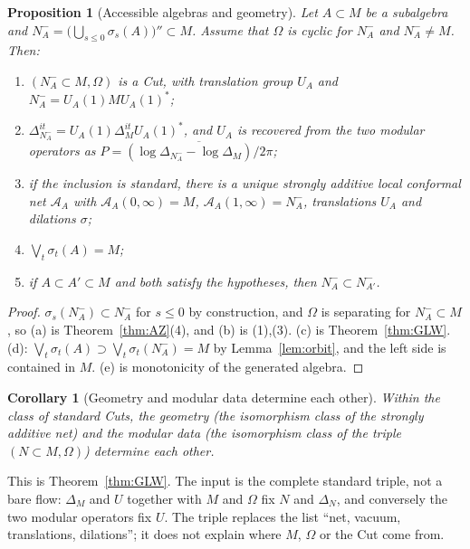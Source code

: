 \documentclass[12pt]{article}
\newtheorem{proposition}[theorem]{Proposition}
\newtheorem{corollary}[theorem]{Corollary}
\theoremstyle{definition}
\theoremstyle{remark}
\begin{document}
\begin{proposition}[Accessible algebras and geometry]\label{prop:dictionary}
Let \(A\subset M\) be a subalgebra and
\(N_A^-=\big(\bigcup_{s\le0}\sigma_s(A)\big)''\subset M\). Assume that \(\Omega\) is
cyclic for \(N_A^-\) and \(N_A^-\ne M\). Then:
\begin{enumerate}[label=(\alph*),leftmargin=2em,itemsep=1pt]
\item \((N_A^-\subset M,\Omega)\) is a Cut, with translation group \(U_A\) and
\(N_A^-=U_A(1)MU_A(1)^*\);
\item \(\Delta_{N_A^-}^{it}=U_A(1)\Delta_M^{it}U_A(1)^*\), and \(U_A\) is recovered
from the two modular operators as \(P=\overline{(\log\Delta_{N_A^-}-\log\Delta_M)/2\pi}\);
\item if the inclusion is standard, there is a unique strongly additive local
conformal net \(\mathcal A_A\) with \(\mathcal A_A(0,\infty)=M\),
\(\mathcal A_A(1,\infty)=N_A^-\), translations \(U_A\) and dilations \(\sigma\);
\item \(\bigvee_{t}\sigma_t(A)=M\);
\item if \(A\subset A'\subset M\) and both satisfy the hypotheses, then
\(N^-_A\subset N^-_{A'}\).
\end{enumerate}
\end{proposition}
\begin{proof}
\(\sigma_s(N_A^-)\subset N_A^-\) for \(s\le0\) by construction, and \(\Omega\) is
separating for \(N_A^-\subset M\), so (a) is Theorem~\ref{thm:AZ}(4), and (b) is
(1),(3). (c) is Theorem~\ref{thm:GLW}. (d): \(\bigvee_t\sigma_t(A)\supset
\bigvee_t\sigma_t(N_A^-)=M\) by Lemma~\ref{lem:orbit}, and the left side is
contained in \(M\). (e) is monotonicity of the generated algebra.
\end{proof}

\begin{corollary}[Geometry and modular data determine each other]\label{cor:GLW}
Within the class of standard Cuts, the geometry (the isomorphism class of the
strongly additive net) and the modular data (the isomorphism class of the
triple \((N\subset M,\Omega)\)) determine each other.
\end{corollary}
This is Theorem~\ref{thm:GLW}. The input is the complete standard triple, not a bare
flow: \(\Delta_M\) and \(U\) together with \(M\) and \(\Omega\) fix \(N\) and
\(\Delta_N\), and conversely the two modular operators fix \(U\). The triple replaces
the list ``net, vacuum, translations, dilations''; it does not explain where
\(M\), \(\Omega\) or the Cut come from.
\end{document}
